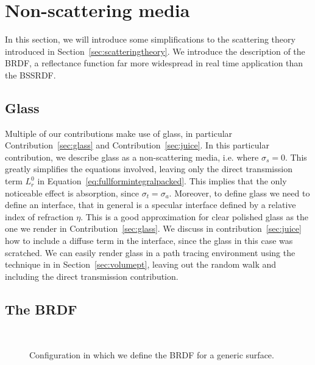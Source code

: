 \section{Non-scattering media}
\label{sec:brdftheory}
In this section, we will introduce some simplifications to the scattering theory introduced in Section~\ref{sec:scatteringtheory}. We introduce the description of the BRDF, a reflectance function far more widespread in real time application than the BSSRDF.   

\subsection{Glass}
\label{sec:glassdescr}
Multiple of our contributions make use of glass, in particular Contribution~\ref{sec:glass} and Contribution~\ref{sec:juice}. In this particular contribution, we describe glass as a non-scattering media, i.e. where $\sigma_s = 0$. This greatly simplifies the equations involved, leaving only the direct transmission term $L^0_r$ in Equation~\ref{eq:fullformintegralpacked}. This implies that the only noticeable effect is absorption, since $\sigma_t = \sigma_a$. Moreover, to define glass we need to define an interface, that in general is a specular interface defined by a relative index of refraction $\eta$. This is a good approximation for clear polished glass as the one we render in Contribution~\ref{sec:glass}. We discuss in contribution~\ref{sec:juice} how to include a diffuse term in the interface, since the glass in this case was scratched. We can easily render glass in a path tracing environment using the technique in in Section~\ref{sec:volumept}, leaving out the random walk and including the direct transmission contribution.

\subsection{The BRDF}
\label{sec:brdfsec}
\begin{figure}
\centering
   \def\svgwidth{0.8\textwidth}
    \\
\caption{Configuration in which we define the BRDF for a generic surface.} %
\label{fig:brdf_configuration}
\end{figure}

